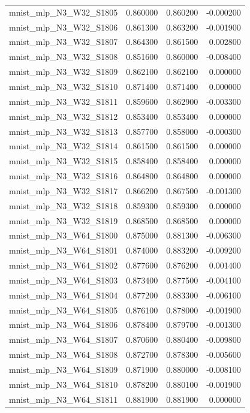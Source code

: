 \begin{tabular}{lrrr}
mnist_mlp_N3_W32_S1805 & 0.860000 & 0.860200 & -0.000200 \\
mnist_mlp_N3_W32_S1806 & 0.861300 & 0.863200 & -0.001900 \\
mnist_mlp_N3_W32_S1807 & 0.864300 & 0.861500 & 0.002800 \\
mnist_mlp_N3_W32_S1808 & 0.851600 & 0.860000 & -0.008400 \\
mnist_mlp_N3_W32_S1809 & 0.862100 & 0.862100 & 0.000000 \\
mnist_mlp_N3_W32_S1810 & 0.871400 & 0.871400 & 0.000000 \\
mnist_mlp_N3_W32_S1811 & 0.859600 & 0.862900 & -0.003300 \\
mnist_mlp_N3_W32_S1812 & 0.853400 & 0.853400 & 0.000000 \\
mnist_mlp_N3_W32_S1813 & 0.857700 & 0.858000 & -0.000300 \\
mnist_mlp_N3_W32_S1814 & 0.861500 & 0.861500 & 0.000000 \\
mnist_mlp_N3_W32_S1815 & 0.858400 & 0.858400 & 0.000000 \\
mnist_mlp_N3_W32_S1816 & 0.864800 & 0.864800 & 0.000000 \\
mnist_mlp_N3_W32_S1817 & 0.866200 & 0.867500 & -0.001300 \\
mnist_mlp_N3_W32_S1818 & 0.859300 & 0.859300 & 0.000000 \\
mnist_mlp_N3_W32_S1819 & 0.868500 & 0.868500 & 0.000000 \\
mnist_mlp_N3_W64_S1800 & 0.875000 & 0.881300 & -0.006300 \\
mnist_mlp_N3_W64_S1801 & 0.874000 & 0.883200 & -0.009200 \\
mnist_mlp_N3_W64_S1802 & 0.877600 & 0.876200 & 0.001400 \\
mnist_mlp_N3_W64_S1803 & 0.873400 & 0.877500 & -0.004100 \\
mnist_mlp_N3_W64_S1804 & 0.877200 & 0.883300 & -0.006100 \\
mnist_mlp_N3_W64_S1805 & 0.876100 & 0.878000 & -0.001900 \\
mnist_mlp_N3_W64_S1806 & 0.878400 & 0.879700 & -0.001300 \\
mnist_mlp_N3_W64_S1807 & 0.870600 & 0.880400 & -0.009800 \\
mnist_mlp_N3_W64_S1808 & 0.872700 & 0.878300 & -0.005600 \\
mnist_mlp_N3_W64_S1809 & 0.871900 & 0.880000 & -0.008100 \\
mnist_mlp_N3_W64_S1810 & 0.878200 & 0.880100 & -0.001900 \\
mnist_mlp_N3_W64_S1811 & 0.881900 & 0.881900 & 0.000000 \\

\end{tabular}
